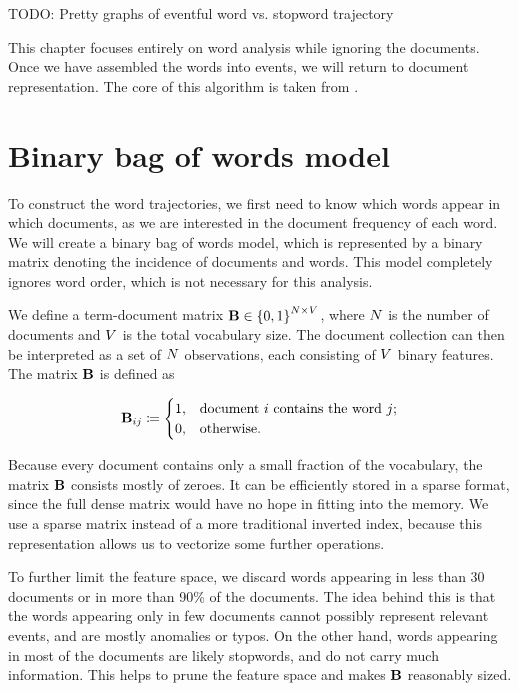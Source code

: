 {\color{red} TODO: Pretty graphs of eventful word vs. stopword trajectory}

This chapter focuses entirely on word analysis while ignoring the documents. Once we have assembled the words into events, we will return to document representation. The core of this algorithm is taken from \cite{event-detection}.


\section{Binary bag of words model}
To construct the word trajectories, we first need to know which words appear in which documents, as we are interested in the document frequency of each word. We will create a binary bag of words model, which is represented by a binary matrix denoting the incidence of documents and words. This model completely ignores word order, which is not necessary for this analysis.

We define a term-document matrix $\mathbf{B} \in \left\{ 0, 1 \right\}^{N \times V}$, where $N$ is the number of documents and $V$ is the total vocabulary size. The document collection can then be interpreted as a set of $N$ observations, each consisting of $V$ binary features. The matrix $\mathbf{B}$ is defined as

\begin{equation} \label{eq:bow-matrix}
	\mathbf{B}_{ij} \coloneqq
	\begin{cases}
		1, & \text{document}~i~\text{contains the word}~j \text{;} \\
		0, & \text{otherwise.}
	\end{cases}
\end{equation}

Because every document contains only a small fraction of the vocabulary, the matrix $\mathbf{B}$ consists mostly of zeroes. It can be efficiently stored in a sparse format, since the full dense matrix would have no hope in fitting into the memory. We use a sparse matrix instead of a more traditional inverted index, because this representation allows us to vectorize some further operations.

To further limit the feature space, we discard words appearing in less than 30 documents or in more than 90\% of the documents. The idea behind this is that the words appearing only in few documents cannot possibly represent relevant events, and are mostly anomalies or typos. On the other hand, words appearing in most of the documents are likely stopwords, and do not carry much information. This helps to prune the feature space and makes $\mathbf{B}$ reasonably sized.


